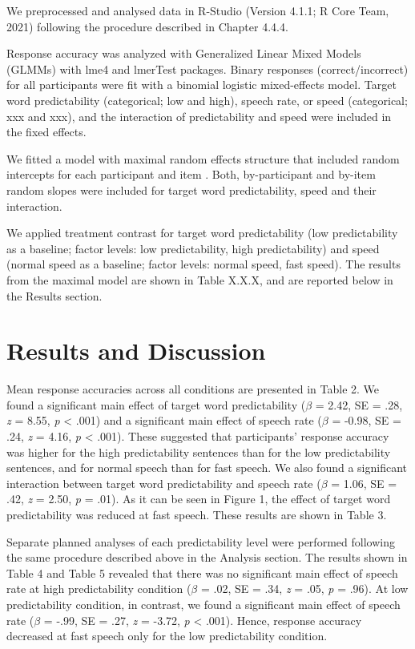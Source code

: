 \documentclass[a4paper, nobind]{templates/ociamthesis}
\begin{document}
We preprocessed and analysed data in R-Studio (Version 4.1.1; R Core Team, 2021) following the procedure described in Chapter 4.4.4.

Response accuracy was analyzed with Generalized Linear Mixed Models (GLMMs) with lme4 \autocite{Bates2015} and lmerTest \autocite{Kuznetsova2017} packages.
Binary responses (correct/incorrect) for all participants were fit with a binomial logistic mixed-effects model\autocite{Jaeger2006,Jaeger2008}.
Target word predictability (categorical; low and high), speech rate, or speed (categorical; xxx and xxx), and the interaction of predictability and speed were included in the fixed effects.

We fitted a model with maximal random effects structure that included random intercepts for each participant and item \autocite{Barr2013}.
Both, by-participant and by-item random slopes were included for target word predictability, speed and their interaction.

We applied treatment contrast for target word predictability (low predictability as a baseline; factor levels: low predictability, high predictability) and speed (normal speed as a baseline; factor levels: normal speed, fast speed).
The results from the maximal model are shown in Table X.X.X, and are reported below in the Results section.

\hypertarget{results-and-discussion-2}{%
\section{Results and Discussion}\label{results-and-discussion-2}}

Mean response accuracies across all conditions are presented in Table 2.
We found a significant main effect of target word predictability (\(\beta\) = 2.42, SE = .28, \emph{z} = 8.55, \emph{p} \textless{} .001) and a significant main effect of speech rate (\(\beta\) = -0.98, SE = .24, \emph{z} = 4.16, \emph{p} \textless{} .001).
These suggested that participants' response accuracy was higher for the high predictability sentences than for the low predictability sentences, and for normal speech than for fast speech.
We also found a significant interaction between target word predictability and speech rate (\(\beta\) = 1.06, SE = .42, \emph{z} = 2.50, \emph{p} = .01). As it can be seen in Figure 1, the effect of target word predictability was reduced at fast speech. These results are shown in Table 3.

Separate planned analyses of each predictability level were performed following the same procedure described above in the Analysis section.
The results shown in Table 4 and Table 5 revealed that there was no significant main effect of speech rate at high predictability condition (\(\beta\) = .02, SE = .34, \emph{z} = .05, \emph{p} = .96).
At low predictability condition, in contrast, we found a significant main effect of speech rate (\(\beta\) = -.99, SE = .27, \emph{z} = -3.72, \emph{p} \textless{} .001).
Hence, response accuracy decreased at fast speech only for the low predictability condition.
\end{document}
